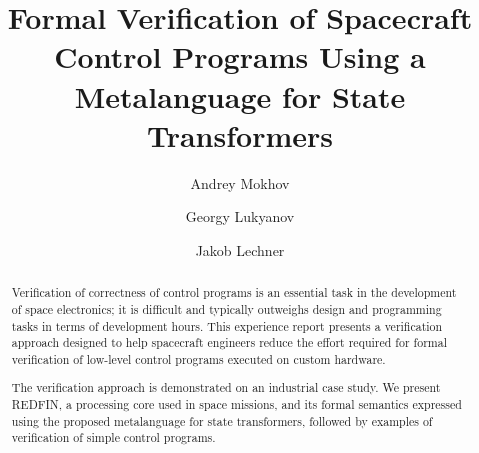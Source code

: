 \documentclass[sigplan,10pt,review,anonymous]{acmart}
\begin{document}
\title[Formal Verification of Spacecraft Control Programs]{Formal Verification
of Spacecraft Control Programs Using a Metalanguage for State Transformers}

\author{Andrey Mokhov}
\author{Georgy Lukyanov}
\author{Jakob Lechner}


\begin{abstract}
Verification of correctness of control programs is an essential task
in the development of space electronics; it is difficult and typically
outweighs design and programming tasks in terms of development hours.
This experience report presents a verification approach designed to help
spacecraft engineers reduce the effort required for formal verification of
low-level control programs executed on custom hardware.


The verification approach is demonstrated on an industrial case study.
We present REDFIN, a processing core used in space missions, and its formal
semantics expressed using the proposed metalanguage for state transformers,
followed by examples of verification of simple control programs.

\end{abstract}

\maketitle
\end{document}
